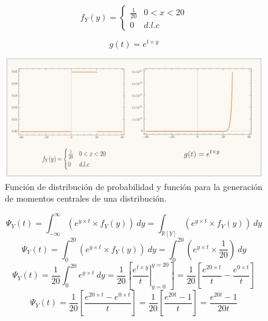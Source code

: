 \documentclass[11pt, spanish]{article}
\begin{document}
\begin{enumerate}[(a)]
\[ f_{Y}(y) = \begin{cases} 
      \frac{1}{20} & 0 < x < 20 \\
      0 & d.l.c
   \end{cases}
\]

$$g(t) = e^{t \times y}$$

\begin{figure}[h]
    \centering
    \includegraphics[width=1\textwidth]{fig4-1.png}
    \caption{Función de distribución de probabilidad y función para la generación de momentos centrales de una distribución.}
    \label{fig:prob_dist2}
\end{figure}

$$\Psi_{Y}(t) = \int_{- \infty}^{\infty} \left( e^{y \times t} \times f_{Y}(y)\right)\ dy = \int_{\mathbb{R}[Y]} \left( e^{y \times t} \times f_{Y}(y)\right)\ dy$$
$$\Psi_{Y}(t) = \int_{0}^{20} \left( e^{y \times t} \times f_{Y}(y)\right)\ dy = \int_{0}^{20} \left( e^{y \times t} \times \frac{1}{20}\right)\ dy$$
$$\Psi_{Y}(t) = \frac{1}{20} \int_{0}^{20} e^{y \times t}\ dy = \frac{1}{20} \left[\left.   \frac{e^{t \times y}}{t} \right|_{y=0}^{y = 20}
 \right] = \frac{1}{20} \left[\frac{e^{20 \times t}}{t} -  \frac{e^{0 \times t}}{t} \right]$$
$$\Psi_{Y}(t) = \frac{1}{20} \left[\frac{e^{20 \times t} - e^{0 \times t}}{t} \right] = \frac{1}{20} \left[\frac{e^{20t} - 1}{t} \right] = \frac{e^{20t} - 1}{20t} $$

\end{enumerate}
\end{document}

